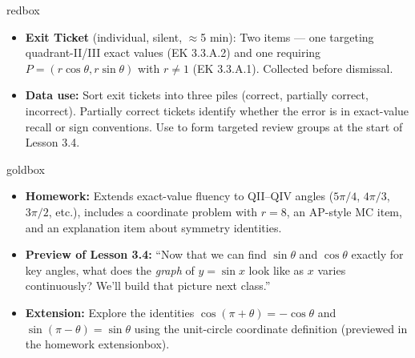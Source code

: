 \documentclass[10pt]{article}
\begin{document}
\begin{skillbox}{redbox}
\begin{itemize}
  \item \textbf{Exit Ticket} (individual, silent, $\approx$5 min): Two items --- one targeting quadrant-II/III exact values (EK 3.3.A.2) and one requiring $P = (r\cos\theta, r\sin\theta)$ with $r \ne 1$ (EK 3.3.A.1). Collected before dismissal.
  \item \textbf{Data use:} Sort exit tickets into three piles (correct, partially correct, incorrect). Partially correct tickets identify whether the error is in exact-value recall or sign conventions. Use to form targeted review groups at the start of Lesson 3.4.
\end{itemize}
\end{skillbox}
\vspace{6pt}

\begin{skillbox}{goldbox}
\begin{itemize}
  \item \textbf{Homework:} Extends exact-value fluency to QII--QIV angles ($5\pi/4$, $4\pi/3$, $3\pi/2$, etc.), includes a coordinate problem with $r = 8$, an AP-style MC item, and an explanation item about symmetry identities.
  \item \textbf{Preview of Lesson 3.4:} ``Now that we can find $\sin\theta$ and $\cos\theta$ exactly for key angles, what does the \emph{graph} of $y = \sin x$ look like as $x$ varies continuously? We'll build that picture next class.''
  \item \textbf{Extension:} Explore the identities $\cos(\pi + \theta) = -\cos\theta$ and $\sin(\pi - \theta) = \sin\theta$ using the unit-circle coordinate definition (previewed in the homework extensionbox).
\end{itemize}
\end{skillbox}
\end{document}

